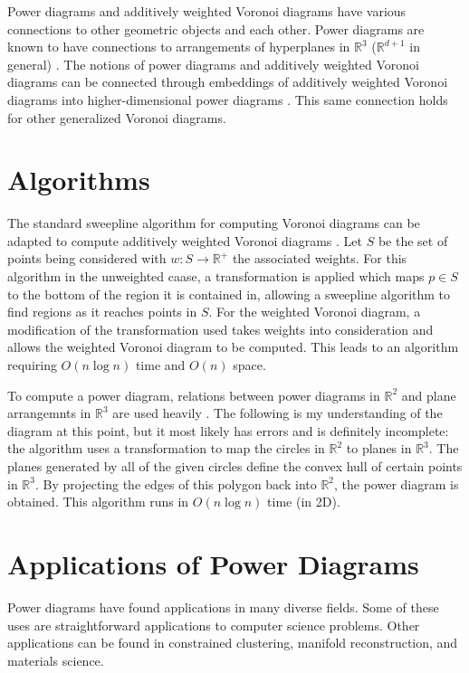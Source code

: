 \documentclass[a4paper]{article}
\newcommand{\R}{\mathbb{R}}
\begin{document}
Power diagrams and additively weighted Voronoi diagrams have various connections to other geometric objects and each other.
Power diagrams are known to have connections to arrangements of hyperplanes in $\R^3$ ($\R^{d+1}$ in general) \cite{aurenhammer_survey}. The notions
of power diagrams and additively weighted Voronoi diagrams can be connected through embeddings of additively weighted Voronoi diagrams into
higher-dimensional power diagrams \cite{aurenhammer_additive}. This same connection holds for other generalized Voronoi diagrams.

\section{Algorithms}

The standard sweepline algorithm for computing Voronoi diagrams can be adapted to compute additively weighted Voronoi diagrams
\cite{fortune_sweepline}. Let $S$ be the set of points being considered with $w:S \to \R^+$ the associated weights. For this algorithm in the
unweighted caase, a transformation is applied which maps $p \in S$ to the bottom of the region it is contained in, allowing a sweepline algorithm to
find regions as it reaches points in $S$. For the weighted Voronoi diagram, a modification of the transformation used takes weights into consideration
and allows the weighted Voronoi diagram to be computed. This leads to an algorithm requiring $O(n \log n)$ time and $O(n)$ space.

To compute a power diagram, relations between power diagrams in $\R^2$ and plane arrangemnts in $\R^3$ are used heavily \cite{aurenhammer_power}.
The following is my understanding of the diagram at this point, but it most likely has errors and is definitely incomplete: the algorithm uses a
transformation to map the circles in $\R^2$ to planes in $\R^3$. The planes generated by all of the given circles define the
convex hull of certain points in $\R^3$. By projecting the edges of this polygon back into $\R^2$, the power diagram is obtained. This algorithm runs
in $O(n \log n)$ time (in 2D).

\section{Applications of Power Diagrams}

Power diagrams have found applications in many diverse fields. Some of these uses are straightforward applications to computer science problems. Other
applications can be found in constrained clustering, manifold reconstruction, and materials science.
\end{document}
